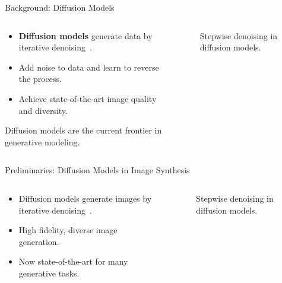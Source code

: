 \begin{refsection}
\begin{frame}{Background: Diffusion Models}
  \begin{columns}[t]
    \begin{column}{0.55\textwidth}
      \begin{itemize}
        \item \textbf{Diffusion models} generate data by iterative denoising~\parencite{sohl2015deep,ho2020denoising}.
        \item Add noise to data and learn to reverse the process.
        \item Achieve state-of-the-art image quality and diversity.
      \end{itemize}
      \vspace{0.8em}
      Diffusion models are the current frontier in generative modeling.
    \end{column}
    \begin{column}{0.35\textwidth}
      \begin{figure}
        \centering
        \caption*{\scriptsize Stepwise denoising in diffusion models.}
      \end{figure}
    \end{column}
  \end{columns}
  \bottomleftrefs
\end{frame}
\end{refsection}

\begin{refsection}
\begin{frame}{Preliminaries: Diffusion Models in Image Synthesis}
  \begin{columns}[t]
    \begin{column}{0.6\textwidth}
      \begin{itemize}
        \item Diffusion models generate images by iterative denoising~\parencite{ho2020denoising}.
        \item High fidelity, diverse image generation.
        \item Now state-of-the-art for many generative tasks.
      \end{itemize}
    \end{column}
    \begin{column}{0.3\textwidth}
      \begin{figure}
        \centering
        \caption[]{\scriptsize Stepwise denoising in diffusion models.}
      \end{figure}
    \end{column}
  \end{columns}
  \bottomleftrefs
\end{frame}
\end{refsection}

